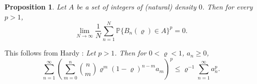 \documentclass[11pt,draft,reqno]{amsart}
\newtheorem{proposition}[theorem]{Proposition}
\theoremstyle{definition}
\theoremstyle{remarks}
\numberwithin{equation}{section}
\def\P{{\mathcal P}}
\def\P{{\mathbb P}}
\begin{document}
\begin{proposition}
Let $A$ be a set of integers of (natural) density $0$. Then for every $p>1$,
\begin{equation}\label{hardy1} \lim_{N\to \infty}\frac{1}{N}\sum_{n=1}^N \P\{ B_n(\varrho)\in A\}^p =0.\end{equation} 
 \end{proposition} 
 This follows from Hardy \cite[ineq.\,3]{H}: {\it Let $p>1$. Then for $0<\varrho <1$, $a_n\ge 0$,}
 \begin{equation}\label{hardy} \sum_{n=1}^\infty \left(\sum_{m=0}^n   {{n}\choose{m}}\varrho^m(1-\varrho)^{n-m}a_m\right)^p\le \varrho^{-1}  \sum_{n=1}^\infty a_n^p.
 \end{equation} 

\end{document}
